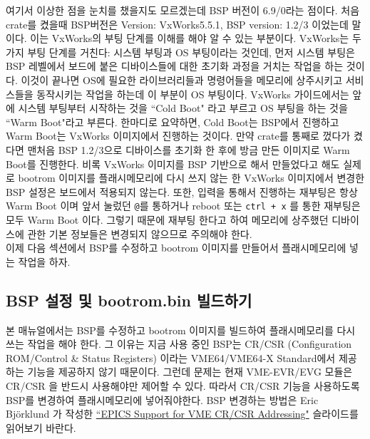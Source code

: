 \documentclass[11pt,a4paper]{article}
\begin{document}
여기서 이상한 점을 눈치를 챘을지도 모르겠는데 BSP 버전이 6.9/0라는 점이다. 처음 crate를 켰을때
BSP버전은 Version: VxWorks5.5.1, BSP version: 1.2/3 이었는데 말이다. 이는 VxWorks의 부팅 단계를 이해를 해야 
알 수 있는 부분이다. VxWorks는 두가지 부팅 단계를 거친다: 시스템 부팅과 OS 부팅이라는 것인데, 먼저 
시스템 부팅은 BSP 레벨에서 보드에 붙은 디바이스들에 대한 초기화 과정을 거치는 작업을 하는 것이다. 이것이 끝나면
OS에 필요한 라이브러리들과 명령어들을 메모리에 상주시키고 서비스들을 동작시키는 작업을 하는데 이 부분이 OS 부팅이다.
VxWorks 가이드에서는 앞에 시스템 부팅부터 시작하는 것을 ``Cold Boot" 라고 부르고 OS 부팅을 하는 것을 ``Warm Boot"라고 부른다.
한마디로 요약하면, Cold Boot는 BSP에서 진행하고 Warm Boot는 VxWorks 이미지에서 진행하는 것이다. 만약 crate를 통째로
껐다가 켰다면 맨처음 BSP 1.2/3으로 디바이스를 초기화 한 후에 방금 만든 이미지로 Warm Boot를 진행한다. 
비록 VxWorks 이미지를 BSP 기반으로 해서 만들었다고 해도 실제로 bootrom 이미지를 플래시메모리에 다시 쓰지 않는 한
VxWorks 이미지에서 변경한 BSP 설정은 보드에서 적용되지 않는다. 또한, 입력을 통해서 진행하는 재부팅은 항상 Warm Boot 이며 
앞서 눌렀던 \verb|@|를 통하거나 reboot 또는 \verb|ctrl + x| 를 통한 재부팅은 모두 Warm Boot 이다. 그렇기 때문에
재부팅 한다고 하여 메모리에 상주했던 디바이스에 관한 기본 정보들은 변경되지 않으므로 주의해야 한다. \\


이제 다음 섹션에서 BSP를 수정하고 bootrom 이미지를 만들어서 플래시메모리에 넣는 작업을 하자.

\subsection{BSP 설정 및 bootrom.bin 빌드하기}

본 매뉴얼에서는 BSP를 수정하고 bootrom 이미지를 빌드하여 플래시메모리를 다시 쓰는 작업을 해야 한다.
그 이유는 지금 사용 중인 BSP는 CR/CSR (Configuration ROM/Control \& Status Registers) 이라는 VME64/VME64-X Standard에서 
제공하는 기능을 제공하지 않기 때문이다. 그런데 문제는 현재 VME-EVR/EVG 모듈은 CR/CSR 을 반드시 사용해야만 제어할 수 있다.
따라서 CR/CSR 기능을 사용하도록 BSP를 변경하여 플래시메모리에 넣어줘야한다. BSP 변경하는 방법은 Eric Björklund 가 작성한 
 \href{https://www.google.co.kr/url?sa=t&rct=j&q=&esrc=s&source=web&cd=3&ved=0CEQQFjAC&url=http%3A%2F%2Fwww.aps.anl.gov%2Fepics%2Fmeetings%2F2006-06%2FRecDevDrv_Support%2FSupport_for_CR-CSR_Addressing.ppt&ei=e_9wU7GUCYj28QW99YCAAg&usg=AFQjCNEOPRpoVT1VXbYzLB-7jMgkm237ow&sig2=knwLs7FrKXkNWzK0yJrAXQ&bvm=bv.66330100,d.dGI&cad=rjt}{``EPICS Support for VME CR/CSR Addressing"} 
슬라이드를 읽어보기 바란다. \\
\end{document}

